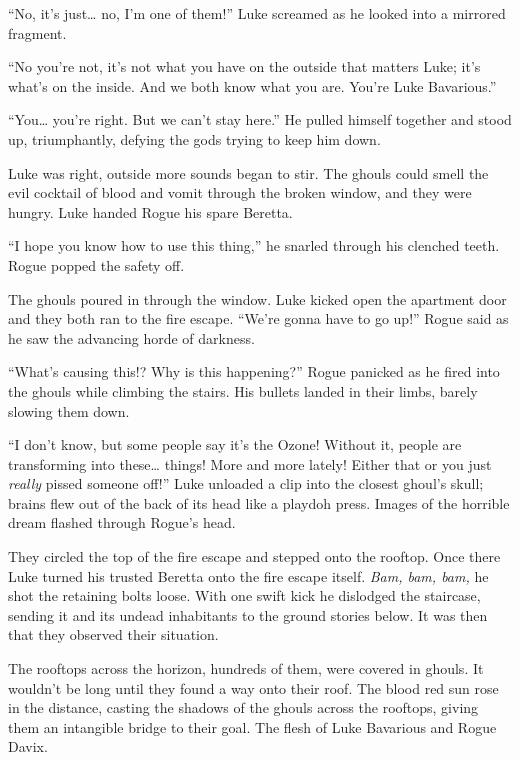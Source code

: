 ``No, it's just{\ldots} no, I'm one of
them!'' Luke screamed as he looked into a mirrored
fragment.

``No you're not, it's not what you have on the
outside that matters Luke; it's what's on the inside.
And we both know what you are. You're Luke
Bavarious.''

``You{\ldots} you're right. But we can't stay
here.'' He pulled himself together and stood up, triumphantly,
defying the gods trying to keep him down.



Luke was right, outside more sounds began to stir. The ghouls could
smell the evil cocktail of blood and vomit through the broken
window, and they were hungry. Luke handed Rogue his spare
Beretta.



``I hope you know how to use this thing,'' he snarled
through his clenched teeth. Rogue popped the safety off.



The ghouls poured in through the window. Luke kicked open the
apartment door and they both ran to the fire escape.
``We're gonna have to go up!'' Rogue said as he saw
the advancing horde of darkness.



``What's causing this!? Why is this happening?''
Rogue panicked as he fired into the ghouls while climbing the
stairs. His bullets landed in their limbs, barely slowing them
down.



``I don't know, but some people say it's the
Ozone! Without it, people are transforming into these{\ldots}
things! More and more lately! Either that or you just {\em really}
pissed someone off!'' Luke unloaded a clip into the closest
ghoul's skull; brains flew out of the back of its head like a
playdoh press. Images of the horrible dream flashed through
Rogue's head.



They circled the top of the fire escape and stepped onto the
rooftop. Once there Luke turned his trusted Beretta onto the fire
escape itself. {\em Bam, bam, bam,} he shot the retaining bolts
loose. With one swift kick he dislodged the staircase, sending it
and its undead inhabitants to the ground stories below. It was then
that they observed their situation.



The rooftops across the horizon, hundreds of them, were covered in
ghouls. It wouldn't be long until they found a way onto their
roof. The blood red sun rose in the distance, casting the shadows
of the ghouls across the rooftops, giving them an intangible bridge
to their goal. The flesh of Luke Bavarious and Rogue Davix.

